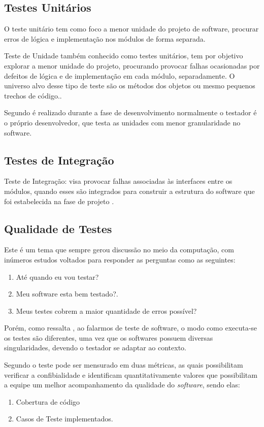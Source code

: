 \subsection{Testes Unitários}
        O teste unitário tem como foco a menor unidade do projeto de software, procurar erros de lógica e implementação nos módulos de forma separada.\cite{PRESSMAN}

         Teste de Unidade também conhecido como testes unitários, tem por objetivo explorar a menor unidade do projeto, procurando provocar falhas ocasionadas por defeitos de lógica e de implementação em cada módulo, separadamente. O universo alvo desse tipo de teste são os métodos dos objetos ou mesmo pequenos trechos de código.\cite{artigo_intro_teste}.

Segundo \cite{sw_test_tech} é realizado durante a fase de desenvolvimento normalmente o testador é o próprio desenvolvedor, que testa as unidades com menor granularidade no software.


\subsection{Testes de Integração}

Teste de Integração: visa provocar falhas associadas às interfaces entre os módulos, quando esses são integrados para construir a estrutura do software que foi estabelecida na fase de projeto \cite{artigo_intro_teste}.


\subsection{Qualidade de Testes}

Este é um tema que sempre gerou discussão no meio da computação, com inúmeros estudos voltados para responder as perguntas como as seguintes:

\begin{enumerate}
\item Até quando eu vou testar?
\item Meu software esta bem testado?.
\item Meus testes cobrem a maior quantidade de erros possível?
\end{enumerate}

Porém, como ressalta \cite{e08}, ao falarmos de teste de software, o modo como executa-se os testes são diferentes, uma vez que os softwares possuem diversas singularidades, devendo o testador se adaptar ao contexto.

Segundo \cite{e08} o teste pode ser mensurado em duas métricas, as quais possibilitam verificar a confibialidade e identificam quantitativamente valores que possibilitam a equipe um melhor acompanhamento da qualidade do \textit{software}, sendo elas:

\begin{enumerate}
\item Cobertura de código
\item Casos de Teste implementados.
\end{enumerate}
